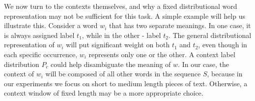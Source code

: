 
We now turn to the contexts themselves, and why a fixed distributional
word representation may not be sufficient for this task. A simple example will
help us illustrate this. Consider a word $w_i$ that has
two separate meanings. In one case, it is always assigned label $t_1$,
while in the other - label $t_2$. The general distributional
representation of $w_i$ will put significant weight on both $t_1$ and
$t_2$, even though in each specific occurrence, $w_i$ represents only one
or the other. A context label distribution $P_c$ could help disambiguate
the meaning of $w$. In our case, the context of $w_i$ will be composed of
all other words in the sequence $S$, because in our experiments we
focus on short to medium length pieces of text. Otherwise, a context
window of fixed length may be a more appropriate choice.

